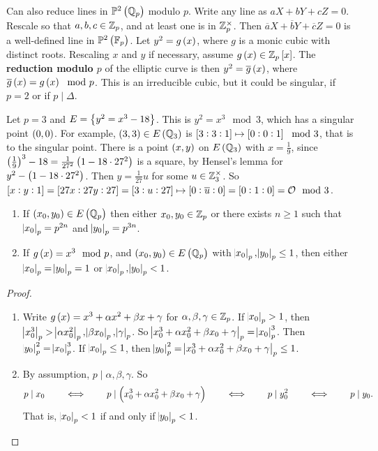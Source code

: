 Can also reduce lines in $ \PP^2\br{\QQ_p} $ modulo $ p $. Write any line as $ aX + bY + cZ = 0 $. Rescale so that $ a, b, c \in \mathbb{Z}_p $, and at least one is in $ \mathbb{Z}_p^\times $. Then $ \overline{a}X + \overline{b}Y + \overline{c}Z = 0 $ is a well-defined line in $ \PP^2\br{\FF_p} $. Let $ y^2 = g\br{x} $, where $ g $ is a monic cubic with distinct roots. Rescaling $ x $ and $ y $ if necessary, assume $ g\br{x} \in \ZZ_p\sbr{x} $. The \textbf{reduction modulo $ p $} of the elliptic curve is then $ y^2 = \overline{g}\br{x} $, where $ \overline{g}\br{x} = g\br{x} \mod p $. This is an irreducible cubic, but it could be singular, if $ p = 2 $ or if $ p \mid \Delta $.

\begin{example}
Let $ p = 3 $ and $ E = \cbr{y^2 = x^3 - 18} $. This is $ y^2 = x^3 \mod 3 $, which has a singular point $ \br{0, 0} $. For example, $ \br{3, 3} \in E\br{\QQ_3} $ is $ \sbr{3 : 3 : 1} \mapsto \sbr{0 : 0 : 1} \mod 3 $, that is to the singular point. There is a point $ \br{x, y} $ on $ E\br{\QQ_3} $ with $ x = \tfrac{1}{9} $, since $ \br{\tfrac{1}{9}}^3 - 18 = \tfrac{1}{27^2}\br{1 - 18 \cdot 27^2} $ is a square, by Hensel's lemma for $ y^2 - \br{1 - 18 \cdot 27^2} $. Then $ y = \tfrac{1}{27}u $ for some $ u \in \mathbb{Z}_3^\times $. So $ \sbr{x : y : 1} = \sbr{27x : 27y : 27} = \sbr{3 : u : 27} \mapsto \sbr{0 : \overline{u} : 0} = \sbr{0 : 1 : 0} = \OOO \mod 3 $.
\end{example}

\begin{lemma}
\hfill
\begin{enumerate}
\item If $ \br{x_0, y_0} \in E\br{\QQ_p} $ then either $ x_0, y_0 \in \mathbb{Z}_p $ or there exists $ n \ge 1 $ such that $ \abs{x_0}_p = p^{2n} $ and $ \abs{y_0}_p = p^{3n} $.
\item If $ g\br{x} = x^3 \mod p $, and $ \br{x_0, y_0} \in E\br{\QQ_p} $ with $ \abs{x_0}_p, \abs{y_0}_p \le 1 $, then either $ \abs{x_0}_p = \abs{y_0}_p = 1 $ or $ \abs{x_0}_p, \abs{y_0}_p < 1 $.
\end{enumerate}
\end{lemma}

\begin{proof}
\hfill
\begin{enumerate}
\item Write $ g\br{x} = x^3 + \alpha x^2 + \beta x + \gamma $ for $ \alpha, \beta, \gamma \in \mathbb{Z}_p $. If $ \abs{x_0}_p > 1 $, then $ \abs{x_0^3}_p > \abs{\alpha x_0^2}_p, \abs{\beta x_0}_p, \abs{\gamma}_p $. So $ \abs{x_0^3 + \alpha x_0^2 + \beta x_0 + \gamma}_p = \abs{x_0}_p^3 $. Then $ \abs{y_0}_p^2 = \abs{x_0}_p^3 $. If $ \abs{x_0}_p \le 1 $, then $ \abs{y_0}_p^2 = \abs{x_0^3 + \alpha x_0^2 + \beta x_0 + \gamma}_p \le 1 $.
\item By assumption, $ p \mid \alpha, \beta, \gamma $. So
$$ p \mid x_0 \qquad \iff \qquad p \mid \br{x_0^3 + \alpha x_0^2 + \beta x_0 + \gamma} \qquad \iff \qquad p \mid y_0^2 \qquad \iff \qquad p \mid y_0. $$
That is, $ \abs{x_0}_p < 1 $ if and only if $ \abs{y_0}_p < 1 $.
\end{enumerate}
\end{proof}

